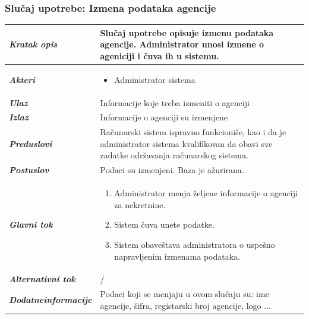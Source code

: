 \documentclass[20pt]{article}
\begin{document}
\subsubsection{\bfseries \large Slu\v{c}aj upotrebe: Izmena podataka agencije}
\begin{center}
\begin{tabular}{p{0.23\linewidth} p{0.77\linewidth}}
\hline

 {\it \bfseries Kratak opis} & Slu\v {c}aj upotrebe opisuje izmenu podataka agencije. Administrator unosi izmene o ageniciji i \v {c}uva ih u sistemu.\\ 

 \hline
 {\it \bfseries Akteri} & \begin{itemize}
    \item Administrator sistema
\end{itemize}\\
\hline

 {\it \bfseries Ulaz} & Informacije koje treba izmeniti o agenciji\\ 
 \hline
 
 {\it \bfseries Izlaz} & Informacije o agenciji su izmenjene\\
 \hline
 
 {\it \bfseries Preduslovi} & Ra\v {c}unarski sistem ispravno funkcioni\v {s}e, kao i da je administrator sistema kvalifikovan da obavi sve zadatke odr\v {z}avanja ra\v {c}unarskog sistema.\\
 \hline

 {\it \bfseries Postuslov} & Podaci su izmenjeni. Baza je a\v {z}urirana.\\
 \hline

     {\it \bfseries Glavni tok} &  
     \begin{enumerate}
         \item  Administrator menja \v {z}eljene informacije o agenciji za nekretnine.
         \item Sistem \v {c}uva unete podatke.
         \item  Sistem obave\v {s}tava administratora o uspe\v {s}no napravljenim izmenama podataka.
    \end{enumerate}\\
 \hline

 {\it \bfseries Alternativni tok} & /\\
 \hline
 
 {\it \bfseries Dodatne\newline informacije} & Podaci koji se menjaju u ovom slu\v {c}aju su: ime agencije, \v {s}ifra, registarski broj agencije, logo ...\\
 \hline

\end{tabular}
\end{center}
\newpage
\end{document}
